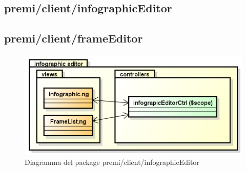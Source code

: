 \clearpage
\subsection{premi/client/infographicEditor}
\subsection{premi/client/frameEditor}
\begin{figure}[h]
\begin{center}
\includegraphics[scale=0.55]{img/diapkg/infographicEditor.png}
\caption{Diagramma del package premi/client/infographicEditor}
\end{center}
\end{figure}





